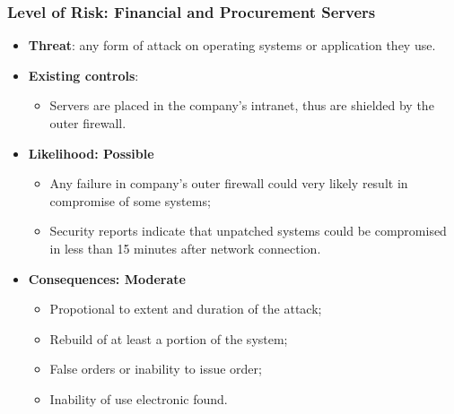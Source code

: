 \documentclass[xcolor ={table,usenames,dvipsnames}]{beamer}
\theoremstyle{definition}
\begin{document}
	\begin{frame}
		\frametitle{Level of Risk: Financial and Procurement Servers}
		\begin{itemize}
			\item \textbf{Threat}: any form of attack on operating systems or application they use.
			\item \textbf{Existing controls}: 
			\begin{itemize}
				\item Servers are placed in the company's intranet, thus are shielded by the outer firewall.
			\end{itemize} 
			\item \textbf{Likelihood: Possible }
			\begin{itemize}
				\item Any failure in company's outer firewall could very likely result in compromise of some systems;
				\item Security reports indicate that unpatched systems could be compromised in less than 15 minutes after network connection. 
			\end{itemize}	
			\item \textbf{Consequences: Moderate }
			\begin{itemize}
				\item Propotional to extent and duration of the attack;
				\item Rebuild of at least a portion of the system;
				\item False orders or inability to issue order;
				\item Inability of use electronic found. 
			\end{itemize}
		\end{itemize}
	\end{frame}
\end{document}
